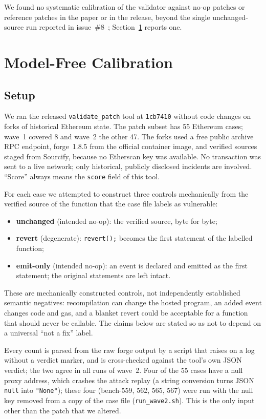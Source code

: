 \documentclass[conference]{IEEEtran}
\newcommand{\code}[1]{\texttt{#1}}
\begin{document}
We found no systematic calibration of the validator against no-op patches or reference patches in the paper or in the release, beyond the single unchanged-source run reported in issue~\#8~\cite{moore}; Section~\ref{sec:calib} reports one.

\section{Model-Free Calibration}
\label{sec:calib}
\subsection{Setup}
We ran the released \code{validate\_patch} tool at \code{1cb7410} without code changes on forks of historical Ethereum state. The patch subset has 55 Ethereum cases; wave~1 covered 8 and wave~2 the other 47. The forks used a free public archive RPC endpoint, forge~1.8.5 from the official container image, and verified sources staged from Sourcify, because no Etherscan key was available. No transaction was sent to a live network; only historical, publicly disclosed incidents are involved. ``Score'' always means the \code{score} field of this tool.

For each case we attempted to construct three controls mechanically from the verified source of the function that the case file labels as vulnerable:
\begin{itemize}
\item \textbf{unchanged} (intended no-op): the verified source, byte for byte;
\item \textbf{revert} (degenerate): \code{revert();} becomes the first statement of the labelled function;
\item \textbf{emit-only} (intended no-op): an event is declared and emitted as the first statement; the original statements are left intact.
\end{itemize}
These are mechanically constructed controls, not independently established semantic negatives: recompilation can change the hosted program, an added event changes code and gas, and a blanket revert could be acceptable for a function that should never be callable. The claims below are stated so as not to depend on a universal ``not a fix'' label.

Every count is parsed from the raw forge output by a script that raises on a log without a verdict marker, and is cross-checked against the tool's own JSON verdict; the two agree in all runs of wave~2. Four of the 55 cases have a null proxy address, which crashes the attack replay (a string conversion turns JSON \code{null} into \code{"None"}); these four (bench-559, 562, 565, 567) were run with the null key removed from a copy of the case file (\code{run\_wave2.sh}). This is the only input other than the patch that we altered.
\end{document}
